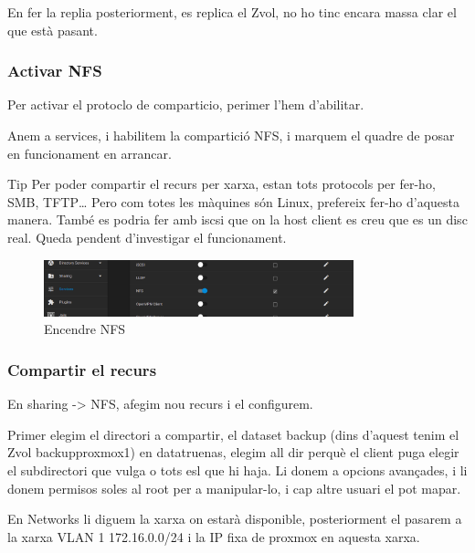 \documentclass[
  10pt,
]{krantz}
\begin{document}
En fer la replia posteriorment, es replica el Zvol, no ho tinc encara massa clar el que està pasant.

\hypertarget{activar-nfs}{%
\subsubsection{Activar NFS}\label{activar-nfs}}

Per activar el protoclo de comparticio, perimer l'hem d'abilitar.

Anem a services, i habilitem la compartició NFS, i marquem el quadre de posar en funcionament en arrancar.

\begin{rmdtip}{Tip}
Per poder compartir el recurs per xarxa, estan tots protocols per fer-ho, SMB, TFTP\ldots{} Pero com totes les màquines són Linux, prefereix fer-ho d'aquesta manera. També es podria fer amb iscsi que on la host client es creu que es un disc real. Queda pendent d'investigar el funcionament.

\end{rmdtip}

\begin{figure}
\centering
\includegraphics[width=0.8\textwidth,height=\textheight]{imatges/proxmox/NFS_up.png}
\caption{Encendre NFS}
\end{figure}

\hypertarget{compartir-el-recurs}{%
\subsubsection{Compartir el recurs}\label{compartir-el-recurs}}

En sharing -\textgreater{} NFS, afegim nou recurs i el configurem.

Primer elegim el directori a compartir, el dataset backup (dins d'aquest tenim el Zvol backupproxmox1) en datatruenas, elegim all dir perquè el client puga elegir el subdirectori que vulga o tots esl que hi haja. Li donem a opcions avançades, i li donem permisos soles al root per a manipular-lo, i cap altre usuari el pot mapar.

En Networks li diguem la xarxa on estarà disponible, posteriorment el pasarem a la xarxa VLAN 1 172.16.0.0/24 i la IP fixa de proxmox en aquesta xarxa.
\end{document}
